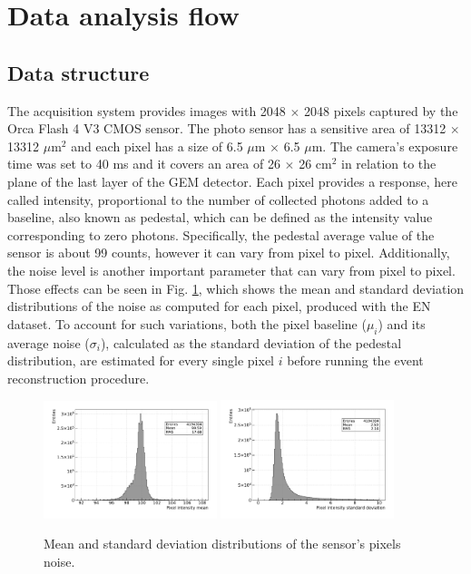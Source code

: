 \documentclass[a4paper,11pt]{article}
\begin{document}
\section{Data analysis flow}
\label{sec:daq}

\subsection{Data structure}

The acquisition system provides images with 2048 $\times$ 2048 pixels captured by the Orca Flash 4 V3 CMOS sensor. The photo sensor has a sensitive area of 13312 $\times$ 13312 $\mu$m$^2$ and each pixel has a size of 6.5 $\mu$m $\times$ 6.5 $\mu$m.
The camera's exposure time was set to 40 ms and it covers an area of 26 $\times$ 26 cm$^2$ in relation to the plane of the last layer of the GEM detector. Each pixel provides a response, here called intensity, proportional to the number of collected photons \cite{bib:nim_orange1} added to a baseline, also known as pedestal, which can be defined as the intensity value corresponding to zero photons. Specifically, the pedestal average value of the sensor is about 99 counts, however it can vary from pixel to pixel.
Additionally, the noise level is another important parameter that can vary from pixel to pixel.
Those effects can be seen in Fig. \ref{fig:sensor_noise}, which shows the mean and standard deviation distributions of the noise as computed for each pixel, produced with the EN dataset.
To account for such variations, both the pixel baseline ($\mu_i$) and its average noise ($\sigma_i$), calculated as the standard deviation of the pedestal distribution,  are estimated for every single pixel $i$ before running the event reconstruction procedure.



\begin{figure}[ht]
\centering
\includegraphics[width=0.45\textwidth]{Mean_2155.pdf}
\includegraphics[width=0.45\textwidth]{Std_2155.pdf}
\caption{Mean and standard deviation distributions of the sensor's pixels noise.}
\label{fig:sensor_noise}
\end{figure}
\end{document}
